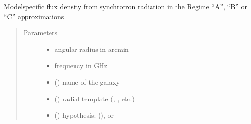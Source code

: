\documentclass[letterpaper,10pt,english]{sphinxmanual}
\begin{document}
\begin{fulllineitems}
\label{\detokenize{diffsph:diffsph.pyflux.synch_flux_density_approx}}
\sphinxAtStartPar
Model\sphinxhyphen{}specific flux density from synchrotron radiation in the Regime “A”, “B” or “C” approximations
\begin{quote}\begin{description}
\item[{Parameters}] \leavevmode\begin{itemize}
\item {} 
\sphinxAtStartPar
{} \textendash{} angular radius in arcmin

\item {} 
\sphinxAtStartPar
{} \textendash{} frequency in GHz

\item {} 
\sphinxAtStartPar
{} () \textendash{} name of the galaxy

\item {} 
\sphinxAtStartPar
{} () \textendash{} radial template (, , etc.)

\item {} 
\sphinxAtStartPar
{} () \textendash{} hypothesis:  (),  or 


\end{itemize}
\end{description}
\end{quote}
\end{fulllineitems}
\end{document}
